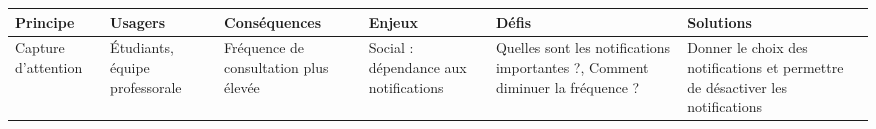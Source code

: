 \begin{tabular}{P{0.15\textwidth}P{0.15\textwidth}P{0.15\textwidth}P{0.15\textwidth}P{0.15\textwidth}P{0.15\textwidth}}
	\hline
	\bf Principe & \bf Usagers & \bf Conséquences & \bf Enjeux & \bf Défis & \bf Solutions \\
	\hline
	\hline
	Capture d'attention
	& Étudiants, équipe professorale
	& Fréquence de consultation plus élevée
	& Social : dépendance aux notifications
	& Quelles sont les notifications importantes ?, Comment diminuer la fréquence ?
	& Donner le choix des notifications et permettre de désactiver les notifications
	\\
	\hline
\end{tabular}